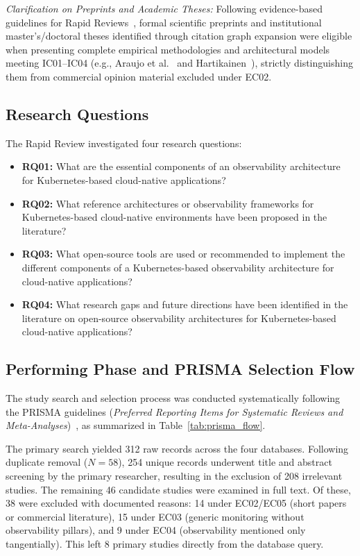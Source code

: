 \documentclass[sigconf, anonymous, balance=false]{acmart}
\begin{document}
\textit{Clarification on Preprints and Academic Theses:} Following evidence-based guidelines for Rapid Reviews~\cite{cartaxo_2018}, formal scientific preprints and institutional master's/doctoral theses identified through citation graph expansion were eligible when presenting complete empirical methodologies and architectural models meeting IC01–IC04 (e.g., Araujo et al.~\cite{araujo_24} and Hartikainen~\cite{hartikainen_2024}), strictly distinguishing them from commercial opinion material excluded under EC02.

\subsection{Research Questions}
The Rapid Review investigated four research questions:
\begin{itemize}
    \item \textbf{RQ01:} What are the essential components of an observability architecture for Kubernetes-based cloud-native applications?
    \item \textbf{RQ02:} What reference architectures or observability frameworks for Kubernetes-based cloud-native environments have been proposed in the literature?
    \item \textbf{RQ03:} What open-source tools are used or recommended to implement the different components of a Kubernetes-based observability architecture for cloud-native applications?
    \item \textbf{RQ04:} What research gaps and future directions have been identified in the literature on open-source observability architectures for Kubernetes-based cloud-native applications?
\end{itemize}

\subsection{Performing Phase and PRISMA Selection Flow}
The study search and selection process was conducted systematically following the PRISMA guidelines (\textit{Preferred Reporting Items for Systematic Reviews and Meta-Analyses})~\cite{page2021prisma}, as summarized in Table~\ref{tab:prisma_flow}.



The primary search yielded 312 raw records across the four databases. Following duplicate removal ($N = 58$), 254 unique records underwent title and abstract screening by the primary researcher, resulting in the exclusion of 208 irrelevant studies. The remaining 46 candidate studies were examined in full text. Of these, 38 were excluded with documented reasons: 14 under EC02/EC05 (short papers or commercial literature), 15 under EC03 (generic monitoring without observability pillars), and 9 under EC04 (observability mentioned only tangentially). This left 8 primary studies directly from the database query.
\end{document}
